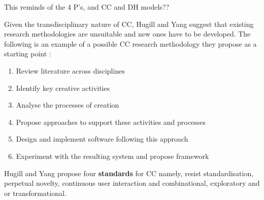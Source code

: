 \begin{draft}
  This reminds of the 4 P’s, and \ac{CC} and \ac{DH} models??
\end{draft}


Given the transdisciplinary nature of \ac{CC}, Hugill and Yang suggest that existing research methodologies are unsuitable and new ones have to be developed. The following is an example of a possible \ac{CC} research methodology they propose as a starting point \autocite[p.17]{Hugill2013c}:

\begin{enumerate}
  \item Review literature across disciplines
  \item Identify key creative activities
  \item Analyse the processes of creation
  \item Propose approaches to support these activities and processes
  \item Design and implement software following this approach
  \item Experiment with the resulting system and propose framework
\end{enumerate}

Hugill and Yang propose four \textbf{standards} for \ac{CC} \autocite[p.17]{Hugill2013c} namely, resist standardisation, perpetual novelty, continuous user interaction and combinational, exploratory and or transformational.

